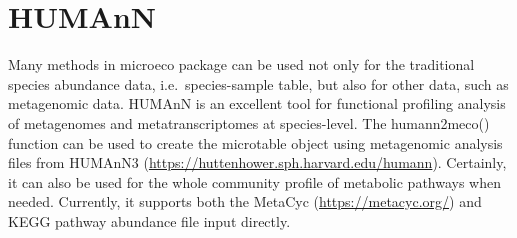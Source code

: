 \documentclass[
]{book}
\begin{document}
\section{HUMAnN}\label{humann}

Many methods in microeco package can be used not only for the traditional species abundance data, i.e.~species-sample table,
but also for other data, such as metagenomic data.
HUMAnN \citep{Franzosa_Species_2018} is an excellent tool for functional profiling analysis of metagenomes and metatranscriptomes at species-level.
The humann2meco() function can be used to create the microtable object using metagenomic analysis files from HUMAnN3 (\url{https://huttenhower.sph.harvard.edu/humann}).
Certainly, it can also be used for the whole community profile of metabolic pathways when needed.
Currently, it supports both the MetaCyc (\url{https://metacyc.org/}) and KEGG pathway abundance file input directly.
\end{document}

